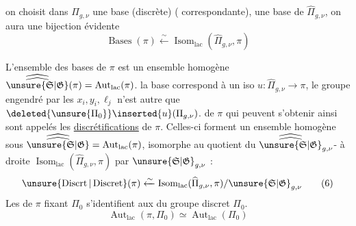 


 on choisit dans $\Pi_{g,\nu}$ une base (discrète) ( correspondante),  une base de $\widehat{\Pi}_{g,\nu}$, on aura une bijection évidente
\[
\operatorname{Bases}(\pi) \xleftarrow{\sim} \operatorname{Isom}_{\mathrm{lac}}(\widehat{\Pi}_{g,\nu},\pi)
\tag{5}
\]

L'ensemble des bases de $\pi$ est un ensemble homogène   $\widehat{\widehat{\unsure{\mathfrak S|\mathfrak G}}}(\pi)=\operatorname{Aut}_{\mathrm{lac}}(\pi)$.  la  base correspond à un iso $u:\widehat{\Pi}_{g,\nu}\longrightarrow\pi$, le groupe  engendré par les $x_i,y_i,\ell_j$ n'est autre que $\deleted{\unsure{\Pi_0}}\inserted{u}(\Pi_{g,\nu})$.   de $\pi$ qui peuvent s'obtenir ainsi sont appelés les \uline{discrétifications} de $\pi$. Celles-ci forment un ensemble homogène sous $\widehat{\widehat{\unsure{\mathfrak S|\mathfrak G}}}=\operatorname{Aut}_{\mathrm{lac}}(\pi)$,  isomorphe au quotient du $\widehat{\widehat{\unsure{\mathfrak S|\mathfrak G}}}_{g,\nu}$- à droite $\operatorname{Isom}_{\mathrm{lac}}(\widehat{\Pi}_{g,\nu},\pi)$ par $\unsure{\mathfrak S|\mathfrak G}_{g,\nu}$ :
\[
\unsure{\operatorname{Discrt}|\operatorname{Discret}}(\pi) \xleftarrow{\sim} \operatorname{Isom}_{\mathrm{lac}}(\widehat{\Pi}_{g,\nu},\pi)/\unsure{\mathfrak S|\mathfrak G}_{g,\nu}
\tag{6}
\]
Les   de $\pi$ fixant  $\Pi_0$ s'identifient aux  du groupe discret  $\Pi_0$.
\[
\operatorname{Aut}_{\mathrm{lac}}(\pi,\Pi_0)\simeq\operatorname{Aut}_{\mathrm{lac}}(\Pi_0)
\tag{7}
\]



